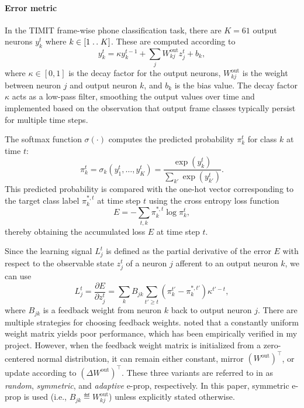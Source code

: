             \paragraph{Error metric}
            In the TIMIT frame-wise phone classification task, there are $K=61$ output neurons $y^t_k$ where $k \in [1\mathrel{{.}\,{.}}\nobreak K]$.
            These are computed according to
            \begin{equation}\label{eq:bellec_y}
            y^t_k = \kappa y^{t-1}_k + \sum_jW^\text{out}_{kj}z^t_j + b_k,
            \end{equation}
            where $\kappa \in [0, 1]$ is the decay factor for the output neurons, $W^\text{out}_{kj}$ is the weight between neuron $j$ and output neuron $k$, and $b_k$ is the bias value.
            The decay factor $\kappa$ acts as a low-pass filter, smoothing the output values over time and implemented based on the observation that output frame classes typically persist for multiple time steps.

            The softmax function $\sigma(\cdot)$ computes the predicted probability $\pi^t_k$ for class $k$ at time $t$:
            \begin{equation}
            \pi^t_k = \sigma_k\left(y^t_1,\ldots,y^t_K\right) = \frac{\exp\left(y^t_k\right)}{\sum_{k'}\exp\left(y^t_{k'}\right)}.
            \end{equation}
            This predicted probability is compared with the one-hot vector corresponding to the target class label $\pi^{*,t}_k$ at time step $t$ using the cross entropy loss function
            \begin{equation}
            E = -\sum_{t,k}\pi^{*,t}_k\log\pi^t_k,
            \end{equation}
            thereby obtaining the accumulated loss $E$ at time step $t$.

            Since the learning signal $L^t_j$ is defined as the partial derivative of the error $E$ with respect to the observable state $z_j^t$ of a neuron $j$ afferent to an output neuron $k$, we can use
            \begin{equation}\label{eq:learningsignal_after_output}
            L^t_j = \frac{\partial E}{\partial z^t_j} = \sum_kB_{jk}\sum_{t'\geq t}\left(\pi^{t'}_k - \pi^{*,t'}_k\right)\kappa^{t'-t},
            \end{equation}
            where $B_{jk}$ is a feedback weight from neuron $k$ back to output neuron $j$.
            There are multiple strategies for choosing feedback weights.
            \citet{bellec2020solution} noted that a constantly uniform weight matrix yields poor performance, which has been empirically verified in my project.
            However, when the feedback weight matrix is initialized from a zero-centered normal distribution, it can remain either constant, mirror $(W^\text{out})^\top$, or update according to $(\Delta W^\text{out})^\top$.
            These three variants are referred to in \citet{bellec2020solution} as \emph{random}, \emph{symmetric}, and \emph{adaptive} e-prop, respectively.
            In this paper, symmetric e-prop is used (i.e., $B_{jk} \eqdef W^\text{out}_{kj}$) unless explicitly stated otherwise.

